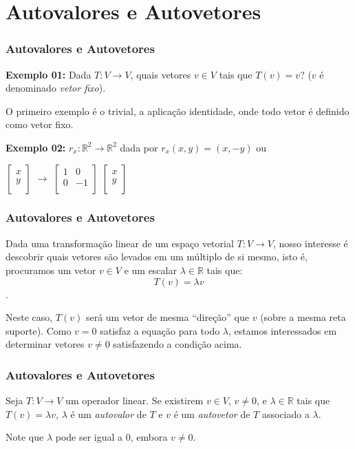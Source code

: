 \documentclass[hyperref={pdfpagelabels=false}]{beamer}
\begin{document}
\section{Autovalores e Autovetores}

\begin{frame}
\frametitle{Autovalores e Autovetores}

{\bf Exemplo 01:} Dada $T: V \rightarrow V$, quais vetores $v \in V$ tais que $T(v) = v$? ($v$ é denominado \emph{vetor fixo}).

O primeiro exemplo é o trivial, a aplicação identidade, onde todo vetor é definido como vetor fixo.

{\bf Exemplo 02: } $r_x:\mathbb{R}^2 \rightarrow \mathbb{R}^2$ dada por $r_x (x,y) = (x,-y)$ ou 

$\left[
\begin{array}{c}
x\\
y \\
\end{array}
\right]$ $\rightarrow$
$\left[
\begin{array}{cc}
1	&	0\\
0	&	-1 \\
\end{array}
\right]$
$\left[
\begin{array}{c}
x\\
y \\
\end{array}
\right]$
 

\end{frame}

\begin{frame}
\frametitle{Autovalores e Autovetores}

Dada uma transformação linear de um espaço vetorial $T: V \rightarrow V$, nosso interesse é descobrir quais vetores são levados em um múltiplo de si mesmo, isto é, procuramos um vetor $v \in V$ e um escalar $\lambda \in \mathbb{R}$ tais que:
$$T(v) = \lambda v$$.

\pause

Neste caso, $T(v)$ será um vetor de mesma ``direção'' que $v$ (sobre a mesma reta suporte). Como $v = 0$ satisfaz a equação para todo $\lambda$, estamos interessados em determinar vetores $v \neq 0$ satisfazendo a condição acima. 

\end{frame}


\begin{frame}
\frametitle{Autovalores e Autovetores}

\begin{definition}
	Seja $T: V \rightarrow V$ um operador linear. Se existirem $v \in V$, $v \neq 0$, e $\lambda \in \mathbb{R}$ tais que $T(v) = \lambda v$, $\lambda$ é um \emph{autovalor} de $T$ e $v$ é um \emph{autovetor} de $T$ associado a $\lambda$.
	
	Note que $\lambda$ pode ser igual a $0$, embora $v \neq 0$.
\end{definition}

\end{frame}
\end{document}
